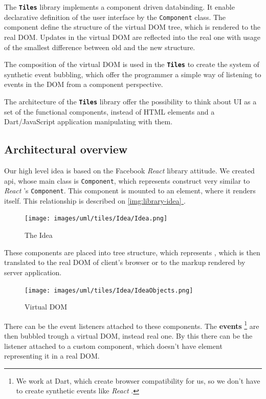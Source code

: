 \documentclass[oneside, 12pt]{book}
\newcommand*{\fullref}[1]{\hyperref[{#1}]{\autoref*{#1} \nameref*{#1}}}
\newcommand{\tiles}[0]{\textbf{\texttt{Tiles}} }
\newcommand{\react}[0]{\textit{React} }
\newcommand{\facebook}[0]{Facebook }
\begin{document}
  The \tiles library implements a component driven databinding. 
  It enable declarative definition of the user interface by the \texttt{Component} class.
  The component define the structure of the virtual DOM tree, which is rendered to the real DOM. 
  Updates in the virtual DOM are reflected into the real one with usage of the smallest difference between old and the new structure.
  
  The composition of the virtual DOM is used in the \tiles to create the system of synthetic event bubbling, 
  which offer the programmer a simple way of listening to events in the DOM from a component perspective.

  The architecture of the \tiles library offer the possibility to think about UI as a set of the functional components, 
  instead of HTML elements and a Dart/JavaScript application manipulating with them.

  \subsection{Architectural overview}\label{subsec:our-architecture-overview}
    Our high level idea is based on the \facebook \react library attitude. 
    We created api, whose main class is \texttt{Component}, which represents construct very similar to \react's \texttt{Component}.
    This component is mounted to an element, where it renders itself. 
    This relationship is described on \fullref{img:library-idea}.
    \begin{figure}[h]
    \centering  
      \texttt{[image: images/uml/tiles/Idea/Idea.png]}
      \caption{The Idea}
      \label{img:library-idea}
    \end{figure}

    These components are placed into tree structure, which represents \mbox{\textbf{}}, 
    which is then translated to the real DOM of client's browser or to the markup rendered by server application.

    \begin{figure}[h]
    \centering  
      \texttt{[image: images/uml/tiles/Idea/IdeaObjects.png]}
      \caption{Virtual DOM}
      \label{img:library-idea-virtual-dom}
    \end{figure}
    There can be the event listeners attached to these components. 
    The \textbf{events} 
    \footnote{We work at Dart, which create browser compatibility for us, so we don't have to create synthetic events like \react.}
    are then bubbled trough a virtual DOM, instead real one.
    By this there can be the listener attached to a custom component, which doesn't have element representing it in a real DOM.
\end{document}
